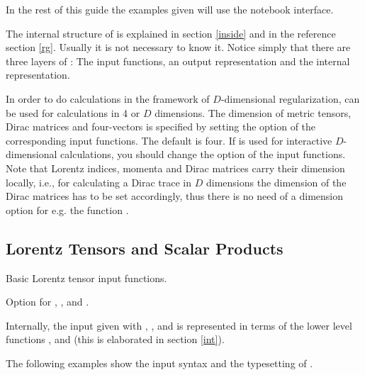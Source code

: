 In the rest of this guide the examples given will use the notebook interface.

The internal structure of \fc
is explained in section \ref{inside} and in the
reference section \ref{rg}. Usually it is not necessary to know it.
Notice simply that there are three layers of \fc: The input functions,
an output representation and the internal representation.

In order to do calculations in the framework of $D$-dimensional
regularization, \fc can be used for  calculations
in 4 or $D$
dimensions.
The dimension of  metric tensors, Dirac matrices and  four-vectors
is specified by setting the option  of the corresponding
input functions.
The default is four. If \fc is  used for interactive
$D$-dimensional calculations, you should change the option of the
input functions. 
Note that Lorentz indices, momenta and
Dirac matrices carry their dimension
locally, i.e., for calculating a Dirac trace in $D$ dimensions the
dimension of the Dirac matrices has to be set accordingly, thus
there is no need of a dimension option for e.g. the function .

\subsection{Lorentz Tensors and Scalar Products}

 {Basic Lorentz tensor input functions.}

 {Option for , ,  and  .}

Internally, the input given with , ,  and
 is represented in terms of the lower level functions ,  and  (this is elaborated in section \ref{int}).

The following examples show the input syntax and the typesetting of \fc.

